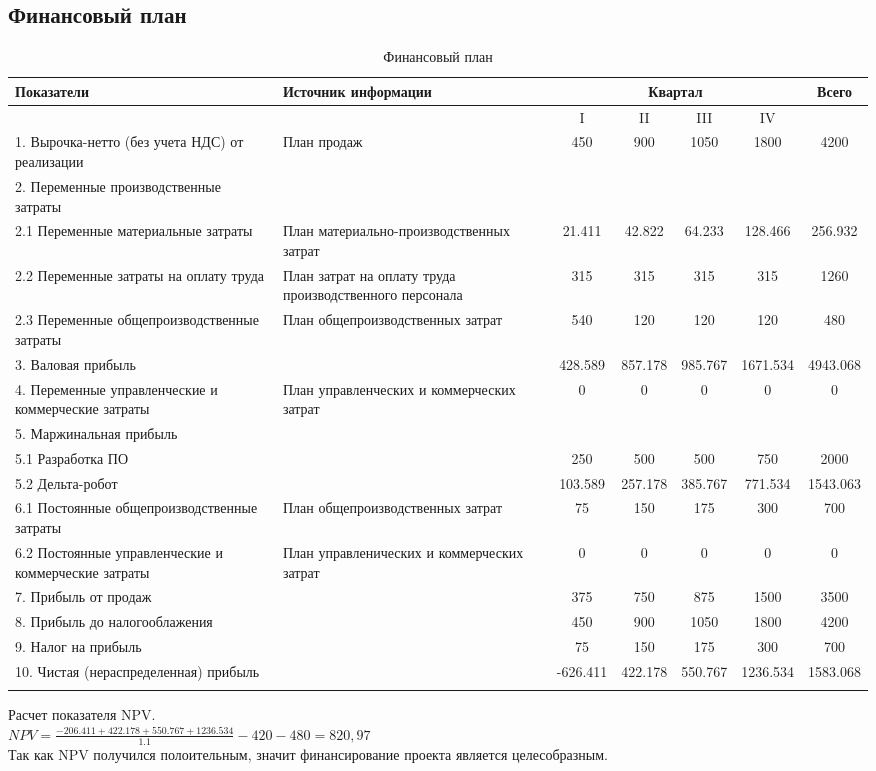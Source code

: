 \subsection{Финансовый план}

\begin{longtable}[c]{|p{110pt}|p{110pt}|c|c|c|c|c|}
\hline
Показатели & Источник информации  &\multicolumn{4}{|c|}{Квартал}   & Всего\\
\hline
& & I & II & III & IV & \\ 
\hline
1. Вырочка-нетто (без учета НДС) от реализации & План продаж  & 450 & 900  & 1050  & 1800  & 4200  \\
\hline
2. Переменные производственные затраты &  &  &  &  &  &  \\
\hline
2.1 Переменные материальные затраты & План материально-производственных затрат  & 21.411 & 42.822  & 64.233  & 128.466  & 256.932  \\
\hline
2.2 Переменные затраты на оплату труда & План затрат на оплату труда производственного персонала   & 315 & 315 & 315 & 315 & 1260 \\
\hline
2.3 Переменные общепроизводственные затраты  & План общепроизводственных затрат  & 540 & 120  & 120  & 120  & 480 \\
\hline
3. Валовая прибыль &  & 428.589 & 857.178  & 985.767 & 1671.534 & 4943.068  \\
\hline
4. Переменные управленческие и коммерческие затраты & План управленческих и коммерческих затрат  & 0  & 0  & 0 & 0 & 0 \\
\hline
5. Маржинальная прибыль &  &  &  &  &  &  \\
\hline
5.1 Разработка ПО  &   & 250  & 500  & 500 & 750  & 2000 \\
\hline
5.2 Дельта-робот &  & 103.589  & 257.178 & 385.767 & 771.534 & 1543.063  \\
\hline
6.1 Постоянные общепроизводственные затраты  & План общепроизводственных затрат  & 75  & 150 & 175  & 300  & 700  \\
\hline
6.2 Постоянные управленческие и коммерческие затраты & План управленических и коммерческих затрат  & 0 & 0 & 0 & 0 & 0 \\
\hline
7. Прибыль от продаж &  & 375  & 750 & 875  & 1500 & 3500  \\
\hline
8. Прибыль до налогооблажения & & 450  & 900 & 1050  & 1800  & 4200  \\
\hline
9. Налог на прибыль &  & 75  &  150  &  175 & 300 & 700 \\
\hline
10. Чистая (нераспределенная) прибыль &  & -626.411  & 422.178 & 550.767 & 1236.534 & 1583.068\\
\hline
\caption{Финансовый план}\label{long}

\end{longtable}


Расчет показателя NPV.\\

$NPV = \frac{-206.411+422.178+550.767+1236.534}{1.1}-420-480= 820,97$\\

Так как NPV получился полоительным, значит финансирование проекта является целесобразным.



